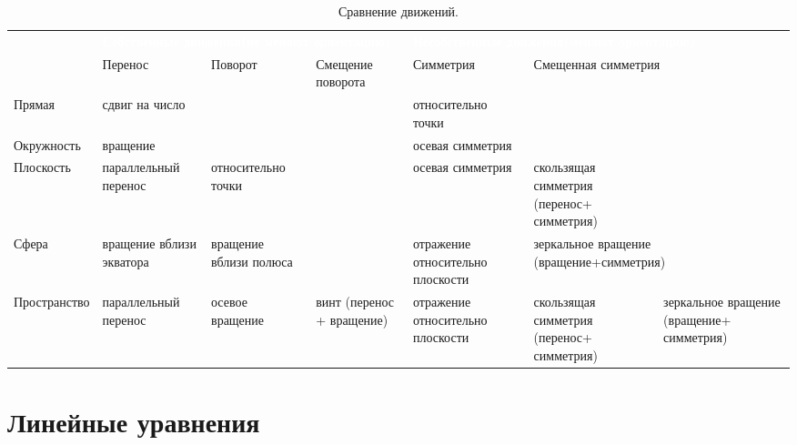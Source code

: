 \begin{table}
\caption{Сравнение движений.}
\label{Transitions}
\begin{tabular}{p{2cm}|p{2.5cm}p{2.5cm}p{2.5cm}p{2cm}p{2.5cm}p{2.5cm}}
\rowcolor{darkred}
& \multicolumn{3}{P{8.5cm}}{\textcolor{white}{\bfseries Собственные движения\linebreak (не меняют ориентацию)}} & \multicolumn{3}{P{8cm}}{\textcolor{white}{\bfseries Несобственные движения\linebreak (меняют ориентацию)}} \\ 
& Перенос & Поворот & Смещение поворота & Симметрия & \multicolumn{2}{p{5cm}}{Смещенная симметрия} \\ \hline \hline
Прямая     & сдвиг на число & & & относи\-тель\-но точки & & \\  \hline
Окруж\-ность & \multicolumn{2}{p{5cm}}{\centerline{вращение}} & & осевая симметрия & & \\ \hline
Плос\-кость  & параллель\-ный перенос & относи\-тель\-но точки & & осевая симметрия & скользящая симметрия (перенос+ сим\-мет\-рия) & \\  \hline
Сфера & вращение вблизи экватора & вращение вблизи полюса & & отражение относительно плоскости & \multicolumn{2}{p{5cm}}{зеркальное вращение (вращение+симметрия)} \\ \hline
Прост\-ранство & параллель\-ный перенос & осевое вращение & винт (перенос + вращение) & отражение относительно плоскости & скользящая симметрия (перенос+ сим\-мет\-рия) & зеркальное вращение (вращение+ сим\-мет\-рия) \\ \hline \hline
\end{tabular}
\end{table}















\chapter{Линейные уравнения}


